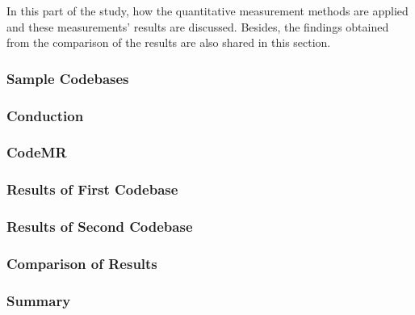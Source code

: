 In this part of the study, how the quantitative measurement methods are applied and these measurements' results are discussed. Besides, the findings obtained from the comparison of the results are also shared in this section.

\subsubsection{Sample Codebases}
\label{section:5.3.1}


\subsubsection{Conduction}


\subsubsection{CodeMR}


\subsubsection{Results of First Codebase}
\subsubsection{Results of Second Codebase}
\subsubsection{Comparison of Results}
\subsubsection{Summary}